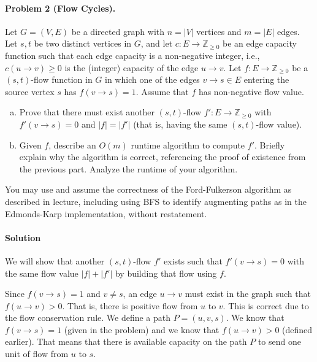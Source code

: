 \documentclass[11pt]{article}
\begin{document}
\newpage
\paragraph{Problem 2 (Flow Cycles).} Let $G=(V,E)$ be a directed graph with $n=|V|$ vertices and $m=|E|$ edges. Let $s, t$ be two distinct vertices in $G$, and let $c: E \rightarrow \mathbb{Z}_{\ge 0}$ be an edge capacity function such that each edge capacity is a non-negative integer, i.e., $c(u\rightarrow v)\ge 0$ is the (integer) capacity of the edge $u\rightarrow v$. Let $f: E \rightarrow \mathbb{Z}_{\ge 0}$ be a $(s,t)$-flow function in $G$ in which one of the edges $v \rightarrow s \in E$ entering the source vertex $s$ has $f(v \rightarrow s) = 1$. Assume that $f$ has non-negative flow value.

\begin{enumerate}[(a)]
    \item Prove that there must exist another $(s,t)$-flow $f': E\rightarrow \mathbb{Z}_{\ge 0}$ with $f'(v\rightarrow s)=0$ and $|f|=|f'|$ (that is, having the same $(s,t)$-flow value).
    
	
    \item Given $f$, describe an $O(m)$ runtime algorithm to compute $f'$. Briefly explain why the algorithm is correct, referencing the proof of existence from the previous part. Analyze the runtime of your algorithm. 
\end{enumerate}

You may use and assume the correctness of the Ford-Fulkerson algorithm as described in lecture, including using BFS to identify augmenting paths as in the Edmonds-Karp implementation, without restatement.

\paragraph{Solution}

We will show that another $(s,t)$-flow $f'$ exists such that
$f'(v \rightarrow s) = 0$ with the same flow value $|f|+|f'|$ by building that
flow using $f$.

Since $f(v\rightarrow s) = 1$ and $v \ne s$, an edge $u \rightarrow v$ must
exist in the graph such that $f(u\rightarrow v) > 0$. That is, there is positive
flow from $u$ to $v$. This is correct due to the flow conservation rule. We
define a path $P = (u,v,s)$. We  know that $f(v\rightarrow s) = 1$ (given in
the problem) and we know that $f(u\rightarrow v) > 0$ (defined earlier). That 
means that there is available capacity on the path $P$ to send one unit of
flow from $u$ to $s$.
\end{document}
